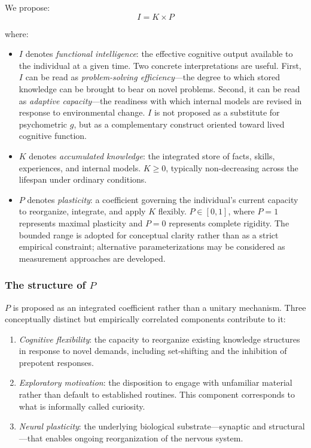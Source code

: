 \documentclass[11pt, a4paper]{article}
\begin{document}
We propose:
\begin{equation}
    I = K \times P
\end{equation}

\noindent where:
\begin{itemize}
    \item $I$ denotes \emph{functional intelligence}: the effective cognitive output available to the individual at a given time. Two concrete interpretations are useful. First, $I$ can be read as \emph{problem-solving efficiency}---the degree to which stored knowledge can be brought to bear on novel problems. Second, it can be read as \emph{adaptive capacity}---the readiness with which internal models are revised in response to environmental change. $I$ is not proposed as a substitute for psychometric $g$, but as a complementary construct oriented toward lived cognitive function.
    
    \item $K$ denotes \emph{accumulated knowledge}: the integrated store of facts, skills, experiences, and internal models. $K \geq 0$, typically non-decreasing across the lifespan under ordinary conditions.
    
    \item $P$ denotes \emph{plasticity}: a coefficient governing the individual's current capacity to reorganize, integrate, and apply $K$ flexibly. $P \in [0, 1]$, where $P = 1$ represents maximal plasticity and $P = 0$ represents complete rigidity. The bounded range is adopted for conceptual clarity rather than as a strict empirical constraint; alternative parameterizations may be considered as measurement approaches are developed.
\end{itemize}

\subsubsection*{The structure of \texorpdfstring{$P$}{P}}

$P$ is proposed as an integrated coefficient rather than a unitary mechanism. Three conceptually distinct but empirically correlated components contribute to it:

\begin{enumerate}
    \item \emph{Cognitive flexibility}: the capacity to reorganize existing knowledge structures in response to novel demands, including set-shifting and the inhibition of prepotent responses.
    
    \item \emph{Exploratory motivation}: the disposition to engage with unfamiliar material rather than default to established routines. This component corresponds to what is informally called curiosity.
    
    \item \emph{Neural plasticity}: the underlying biological substrate---synaptic and structural---that enables ongoing reorganization of the nervous system.
\end{enumerate}
\end{document}
